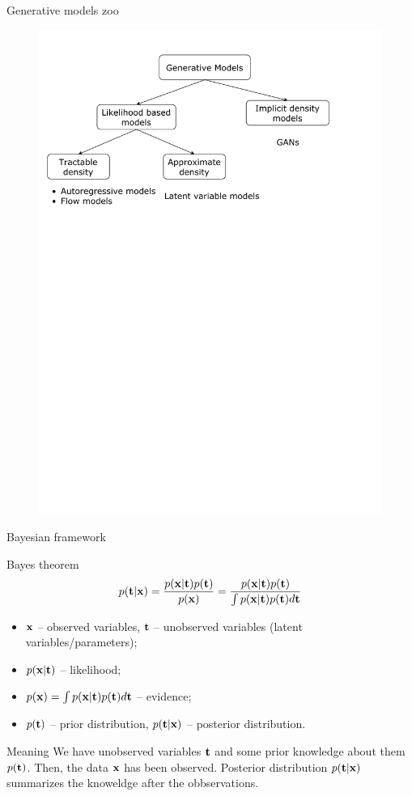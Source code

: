 \begin{frame}{Generative models zoo}
    \begin{figure}
        \centering
        \includegraphics[width=1.0\linewidth]{figs/generative_models_zoo.pdf}
        \label{fig:generative_models_zoo}
    \end{figure}
\end{frame}
\begin{frame}{Bayesian framework}
	\begin{block}{Bayes theorem}
		\[
			p(\mathbf{t} | \mathbf{x}) = \frac{p(\mathbf{x} | \mathbf{t}) p(\mathbf{t})}{p(\mathbf{x})} = \frac{p(\mathbf{x} | \mathbf{t}) p(\mathbf{t})}{\int p(\mathbf{x} | \mathbf{t}) p(\mathbf{t}) d \mathbf{t}} 
		\]
		\begin{itemize}
			\item $\mathbf{x}$ -- observed variables, $\mathbf{t}$ -- unobserved variables (latent variables/parameters);
			\item $p(\mathbf{x} | \mathbf{t})$ -- likelihood;
			\item $p(\mathbf{x}) = \int p(\mathbf{x} | \mathbf{t}) p(\mathbf{t}) d \mathbf{t}$ -- evidence;
			\item $p(\mathbf{t})$ -- prior distribution, $p(\mathbf{t} | \mathbf{x})$ -- posterior distribution.
		\end{itemize}
	\end{block}
	\begin{block}{Meaning}
		We have unobserved variables $\mathbf{t}$ and some prior knowledge about them $p(\mathbf{t})$. Then, the data $\mathbf{x}$ has been observed. 
		Posterior distribution $p(\mathbf{t} | \mathbf{x})$ summarizes the knoweldge after the obbservations.
	\end{block}
\end{frame}
